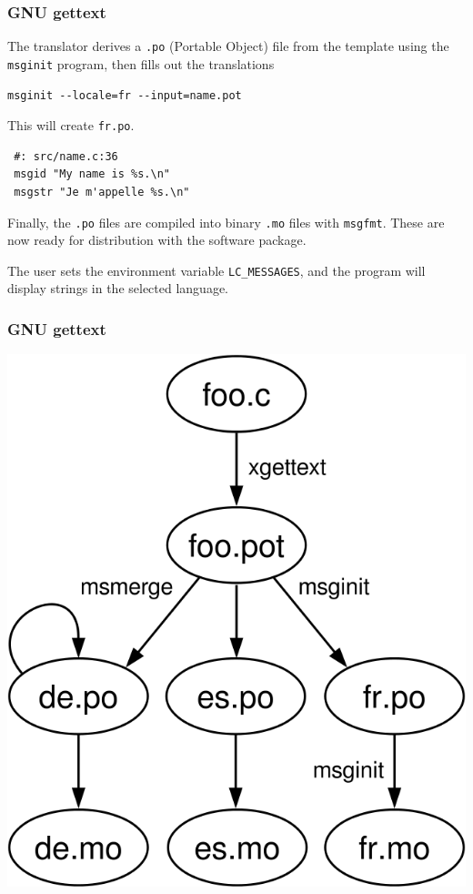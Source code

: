 \documentclass{beamer}
\begin{document}
\begin{frame}[fragile]
  \frametitle{GNU gettext}
The translator derives a \texttt{.po} (Portable Object) file from the template
using the \texttt{msginit} program, then fills out the translations

\begin{verbatim}
msginit --locale=fr --input=name.pot
\end{verbatim}

This will create \texttt{fr.po}.

\begin{verbatim}
 #: src/name.c:36
 msgid "My name is %s.\n"
 msgstr "Je m'appelle %s.\n"
\end{verbatim}
Finally, the \texttt{.po} files are compiled into binary \texttt{.mo} files
with \texttt{msgfmt}.  These are now ready for distribution with the software
package.

The user sets the environment variable \texttt{LC\_MESSAGES}, and the program
will display strings in the selected language.
\end{frame}

\begin{frame}[fragile]
  \frametitle{GNU gettext}
  \begin{center}
    \includegraphics[scale=0.3]{Gettext}
  \end{center}
\end{frame}
\end{document}
